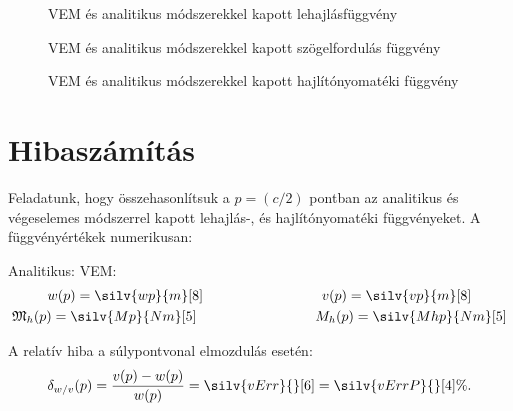 \documentclass[a4paper, 12pt]{scrartcl}
\begin{document}
\begin{figure}[H]
  \hfill
  
  \vspace{-3mm}
  \caption{VEM és \textcolor{cyan!40!black}{ana}\textcolor{yellow!40!black}{liti}\textcolor{red!40!black}{kus} módszerekkel kapott lehajlásfüggvény}
  \label{fig:plot-v}
\end{figure}
\vspace{-3mm}
\begin{figure}[H]
  \hfill
  
  \vspace{-3mm}
  \caption{VEM és \textcolor{cyan!40!black}{ana}\textcolor{yellow!40!black}{liti}\textcolor{red!40!black}{kus} módszerekkel kapott szögelfordulás függvény}
  \label{fig:plot-phi}
\end{figure}
\vspace{-3mm}
\begin{figure}[H]
  \hfill
  
  \vspace{-3mm}
  \caption{VEM és \textcolor{cyan!40!black}{ana}\textcolor{yellow!40!black}{liti}\textcolor{red!40!black}{kus} módszerekkel kapott hajlítónyomatéki függvény}
  \label{fig:plot-Mh}
\end{figure}

\section{Hibaszámítás}

Feladatunk, hogy összehasonlítsuk a $p = (c / 2)$ pontban az analitikus és 
végeselemes módszerrel kapott lehajlás-, és hajlítónyomatéki függvényeket.
A függvényértékek numerikusan:

\hspace{4cm} Analitikus: \hfill VEM: \hspace{5cm}
\begin{gather}
  w(p) = \silv{wp}{m}[8]
  \hspace{3cm}
  v(p) = \silv{vp}{m}[8]
  \\
  \spec M_h(p) = \silv{Mp}{Nm}[5]
  \hspace{3cm}
  M_h(p) = \silv{Mhp}{Nm}[5]
\end{gather}

A relatív hiba a súlypontvonal elmozdulás esetén:
\begin{equation}
  \delta_{w/v}(p) 
  = \frac{v(p) - w(p)}{w(p)}
  = \silv{vErr}{}[6]
  = \silv{vErrP}{}[4] \%
  \text.
  \label{eq:v-rel}
\end{equation}
\end{document}
